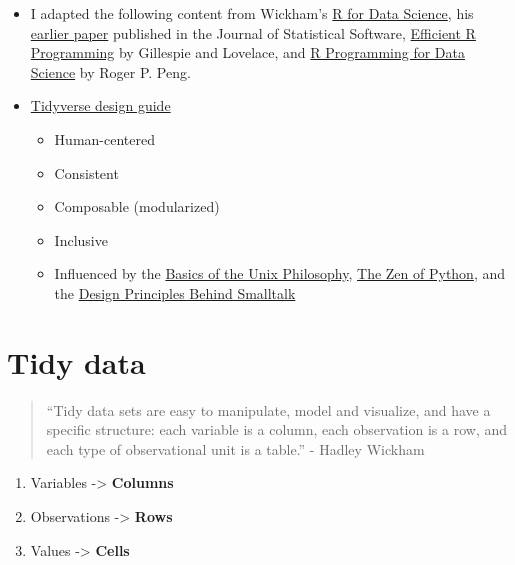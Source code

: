 \documentclass[
]{book}
\providecommand{\tightlist}{%
  \setlength{\itemsep}{0pt}\setlength{\parskip}{0pt}}
\begin{document}
\begin{itemize}
\item
  I adapted the following content from Wickham's \href{https://r4ds.had.co.nz/tidy-data.html}{R for Data Science}, his \href{http://www.jstatsoft.org/v59/i10/paper}{earlier paper} published in the Journal of Statistical Software, \href{https://csgillespie.github.io/efficientR/}{Efficient R Programming} by Gillespie and Lovelace, and \href{https://bookdown.org/rdpeng/rprogdatascience/}{R Programming for Data Science} by Roger P. Peng.
\item
  \href{https://design.tidyverse.org/unifying-principles.html}{Tidyverse design guide}

  \begin{itemize}
  \item
    Human-centered
  \item
    Consistent
  \item
    Composable (modularized)
  \item
    Inclusive
  \item
    Influenced by the \href{https://homepage.cs.uri.edu/~thenry/resources/unix_art/ch01s06.html}{Basics of the Unix Philosophy}, \href{https://www.python.org/dev/peps/pep-0020/}{The Zen of Python}, and the \href{https://refs.devinmcgloin.com/smalltalk/Design-Principles-Behind-Smalltalk.pdf}{Design Principles Behind Smalltalk}
  \end{itemize}
\end{itemize}

\hypertarget{tidy-data}{%
\section{Tidy data}\label{tidy-data}}

\begin{quote}
``Tidy data sets are easy to manipulate, model and visualize, and have a specific structure: each variable is a column, each observation is a row, and each type of observational unit is a table.'' - Hadley Wickham
\end{quote}

\begin{enumerate}
\def\labelenumi{\arabic{enumi}.}
\tightlist
\item
  Variables -\textgreater{} \textbf{Columns}
\item
  Observations -\textgreater{} \textbf{Rows}
\item
  Values -\textgreater{} \textbf{Cells}
\end{enumerate}
\end{document}
